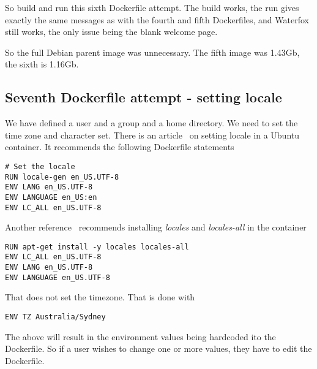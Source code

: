 \documentclass[a4paper]{article}  %
\begin{document}
So build and run this sixth Dockerfile attempt. The build works, the run gives exactly the same messages as with the fourth and fifth Dockerfiles, and Waterfox still works, the only issue being the blank welcome page.

So the full Debian parent image was unnecessary. The fifth image was 1.43Gb, the sixth is 1.16Gb. 

\subsection{Seventh Dockerfile attempt - setting locale}
We  have defined a user and a group and a home directory. We need to set the time zone and character set. There is an article~\cite{dock:11} on setting locale in a Ubuntu container. It recommends the following Dockerfile statements
\begin{tcolorbox}
\begin{verbatim}
# Set the locale
RUN locale-gen en_US.UTF-8  
ENV LANG en_US.UTF-8  
ENV LANGUAGE en_US:en  
ENV LC_ALL en_US.UTF-8  
\end{verbatim}
\end{tcolorbox}
Another reference~\cite{dock:12} recommends installing {\em locales} and {\em locales-all} in the container
\begin{tcolorbox}
\begin{verbatim}
RUN apt-get install -y locales locales-all
ENV LC_ALL en_US.UTF-8
ENV LANG en_US.UTF-8
ENV LANGUAGE en_US.UTF-8
\end{verbatim}
\end{tcolorbox}
That does not set the timezone. That is done with 
\begin{tcolorbox}
\begin{verbatim}
ENV TZ Australia/Sydney
\end{verbatim}
\end{tcolorbox}
The above will result in the environment values being hardcoded ito the Dockerfile. So if a user wishes to change one or more values, they have to edit the Dockerfile.
\end{document}
